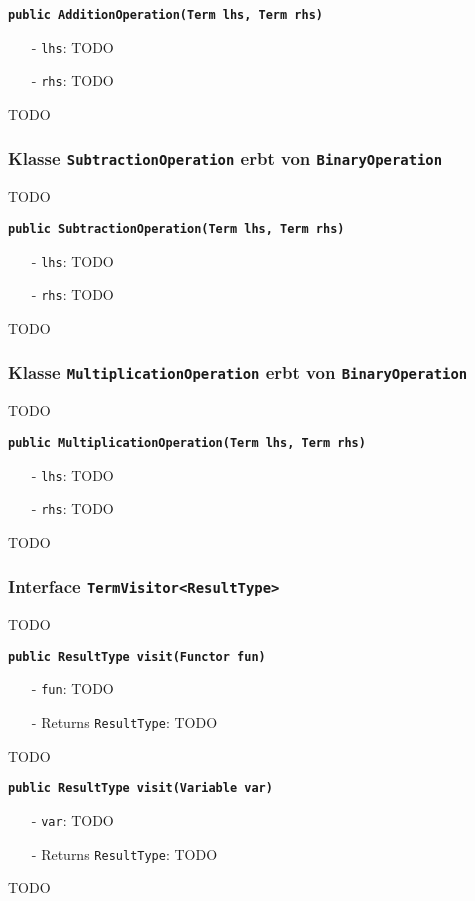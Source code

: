 \documentclass[parskip=full,11pt,twoside]{scrartcl}
\begin{document}
\textbf{\texttt{public AdditionOperation(Term lhs, Term rhs)}}
\begin{itemize}[noitemsep]
	\item[-] \texttt{lhs}: TODO
	\item[-] \texttt{rhs}: TODO
\end{itemize}
TODO

\subsubsection{Klasse \texttt{SubtractionOperation} erbt von \texttt{BinaryOperation}}
TODO

\textbf{\texttt{public SubtractionOperation(Term lhs, Term rhs)}}
\begin{itemize}[noitemsep]
	\item[-] \texttt{lhs}: TODO
	\item[-] \texttt{rhs}: TODO
\end{itemize}
TODO

\subsubsection{Klasse \texttt{MultiplicationOperation} erbt von \texttt{BinaryOperation}}
TODO

\textbf{\texttt{public MultiplicationOperation(Term lhs, Term rhs)}}
\begin{itemize}[noitemsep]
	\item[-] \texttt{lhs}: TODO
	\item[-] \texttt{rhs}: TODO
\end{itemize}
TODO
\subsubsection{Interface \texttt{TermVisitor<ResultType>}}
TODO

\textbf{\texttt{public ResultType visit(Functor fun)}}
\begin{itemize}[noitemsep]
	\item[-] \texttt{fun}: TODO
	\item[-] Returns \texttt{ResultType}: TODO
\end{itemize}
TODO

\textbf{\texttt{public ResultType visit(Variable var)}}
\begin{itemize}[noitemsep]
	\item[-] \texttt{var}: TODO
	\item[-] Returns \texttt{ResultType}: TODO
\end{itemize}
TODO
\end{document}
